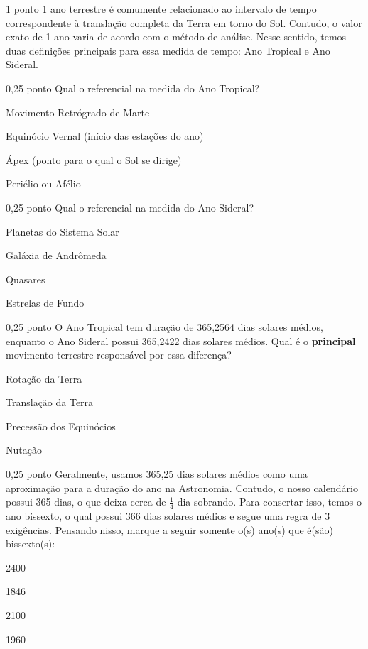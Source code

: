 \documentclass{../lista}
\begin{document}
	\begin{questao}{1 ponto}
		1 ano terrestre é comumente relacionado ao intervalo de tempo correspondente à translação completa da Terra em torno do Sol. Contudo, o valor exato de 1 ano varia de acordo com o método de análise. Nesse sentido, temos duas definições principais para essa medida de tempo: Ano Tropical e Ano Sideral.
		\begin{pergunta}{0,25 ponto}
			Qual o referencial na medida do Ano Tropical?
			\begin{alternativas}
				\item Movimento Retrógrado de Marte
				\item Equinócio Vernal (início das estações do ano)
				\item Ápex (ponto para o qual o Sol se dirige)
				\item Periélio ou Afélio
			\end{alternativas}
		\end{pergunta}
		\begin{pergunta}{0,25 ponto}
			Qual o referencial na medida do Ano Sideral?
			\begin{alternativas}
				\item Planetas do Sistema Solar
				\item Galáxia de Andrômeda
				\item Quasares
				\item Estrelas de Fundo
			\end{alternativas}
		\end{pergunta}
		\begin{pergunta}{0,25 ponto}
			O Ano Tropical tem duração de 365,2564 dias solares médios, enquanto o Ano Sideral possui 365,2422 dias solares médios. Qual é o \textbf{principal} movimento terrestre responsável por essa diferença?
			\begin{alternativas}
				\item Rotação da Terra
				\item Translação da Terra
				\item Precessão dos Equinócios
				\item Nutação
			\end{alternativas}
		\end{pergunta}
		\begin{pergunta}{0,25 ponto}
			Geralmente, usamos 365,25 dias solares médios como uma aproximação para a duração do ano na Astronomia. Contudo, o nosso calendário possui 365 dias, o que deixa cerca de $\frac{1}{4}$ dia sobrando. Para consertar isso, temos o ano bissexto, o qual possui 366 dias solares médios e segue uma regra de 3 exigências. Pensando nisso, marque a seguir somente o(s) ano(s) que é(são) bissexto(s):
			\begin{alternativas}
				\item 2400
				\item 1846
				\item 2100
				\item 1960
			\end{alternativas}
		\end{pergunta}
	\end{questao}
	
\end{document}
